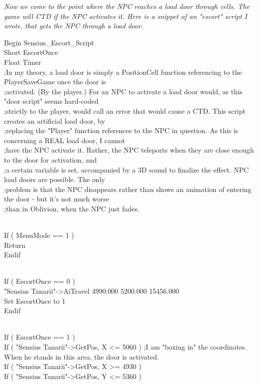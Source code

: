 \documentclass[
]{article}
\begin{document}
\emph{\hfill\break
Now we come to the point where the NPC reaches a load door through
cells. The game will CTD if the NPC activates it. Here is a snippet of
an "escort" script I wrote, that gets the NPC through a load door.}

Begin Sensius\_Escort\_Script\\
Short EscortOnce\\
Float Timer\\
;In my theory, a load door is simply a PositionCell function referencing
to the PlayerSaveGame once the door is\\
;activated. (By the player.) For an NPC to activate a load door would,
as this "door script" seems hard-coded\\
;strictly to the player, would call an error that would cause a CTD.
This script creates an artificial load door, by\\
;replacing the "Player" function references to the NPC in question. As
this is concerning a REAL load door, I cannot\\
;have the NPC activate it. Rather, the NPC teleports when they are close
enough to the door for activation, and\\
;a certain variable is set, accompanied by a 3D sound to finalize the
effect. NPC load doors are possible. The only\\
;problem is that the NPC disappears rather than shows an animation of
entering the door - but it's not much worse\\
;than in Oblivion, when the NPC just fades.\\
\strut \\
If ( MenuMode == 1 )\\
Return\\
Endif\\
\strut \\
If ( EscortOnce == 0 )\\
"Sensius Tanarii"-\textgreater AiTravel 4990.000 5200.000 15456.000\\
Set EscortOnce to 1\\
Endif\\
\strut \\
If ( EscortOnce == 1 )\\
If ( "Sensius Tanarii"-\textgreater GetPos, X \textless= 5060 ) ;I am
"boxing in" the coordinates. When he stands in this area, the door is
activated.\\
If ( "Sensius Tanarii"-\textgreater GetPos, X \textgreater= 4930 )\\
If ( "Sensius Tanarii"-\textgreater GetPos, Y \textless= 5360 )\\
\end{document}
